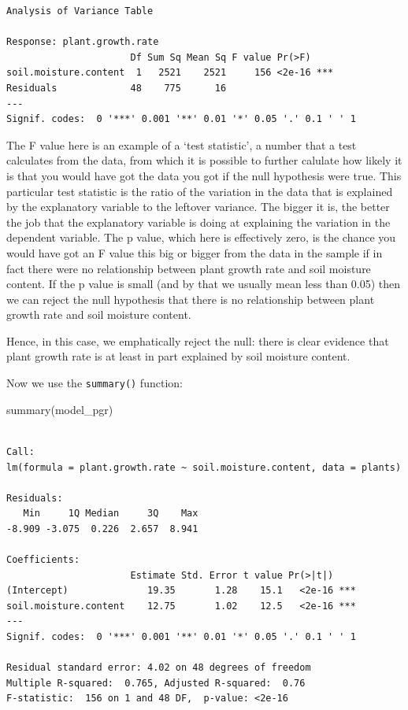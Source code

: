 \documentclass[
  letterpaper,
  DIV=11,
  numbers=noendperiod]{scrreprt}
\newenvironment{Shaded}{\begin{snugshade}}{\end{snugshade}}
\newcommand{\FunctionTok}[1]{\textcolor[rgb]{0.28,0.35,0.67}{#1}}
\newcommand{\NormalTok}[1]{\textcolor[rgb]{0.00,0.23,0.31}{#1}}
\begin{document}
\begin{verbatim}
Analysis of Variance Table

Response: plant.growth.rate
                      Df Sum Sq Mean Sq F value Pr(>F)    
soil.moisture.content  1   2521    2521     156 <2e-16 ***
Residuals             48    775      16                   
---
Signif. codes:  0 '***' 0.001 '**' 0.01 '*' 0.05 '.' 0.1 ' ' 1
\end{verbatim}

The F value here is an example of a `test statistic', a number that a
test calculates from the data, from which it is possible to further
calulate how likely it is that you would have got the data you got if
the null hypothesis were true. This particular test statistic is the
ratio of the variation in the data that is explained by the explanatory
variable to the leftover variance. The bigger it is, the better the job
that the explanatory variable is doing at explaining the variation in
the dependent variable. The p value, which here is effectively zero, is
the chance you would have got an F value this big or bigger from the
data in the sample if in fact there were no relationship between plant
growth rate and soil moisture content. If the p value is small (and by
that we usually mean less than 0.05) then we can reject the null
hypothesis that there is no relationship between plant growth rate and
soil moisture content.

Hence, in this case, we emphatically reject the null: there is clear
evidence that plant growth rate is at least in part explained by soil
moisture content.

Now we use the \texttt{summary()} function:

\begin{Shaded}
\begin{Highlighting}[]
\FunctionTok{summary}\NormalTok{(model\_pgr)}
\end{Highlighting}
\end{Shaded}

\begin{verbatim}

Call:
lm(formula = plant.growth.rate ~ soil.moisture.content, data = plants)

Residuals:
   Min     1Q Median     3Q    Max 
-8.909 -3.075  0.226  2.657  8.941 

Coefficients:
                      Estimate Std. Error t value Pr(>|t|)    
(Intercept)              19.35       1.28    15.1   <2e-16 ***
soil.moisture.content    12.75       1.02    12.5   <2e-16 ***
---
Signif. codes:  0 '***' 0.001 '**' 0.01 '*' 0.05 '.' 0.1 ' ' 1

Residual standard error: 4.02 on 48 degrees of freedom
Multiple R-squared:  0.765, Adjusted R-squared:  0.76 
F-statistic:  156 on 1 and 48 DF,  p-value: <2e-16
\end{verbatim}
\end{document}
